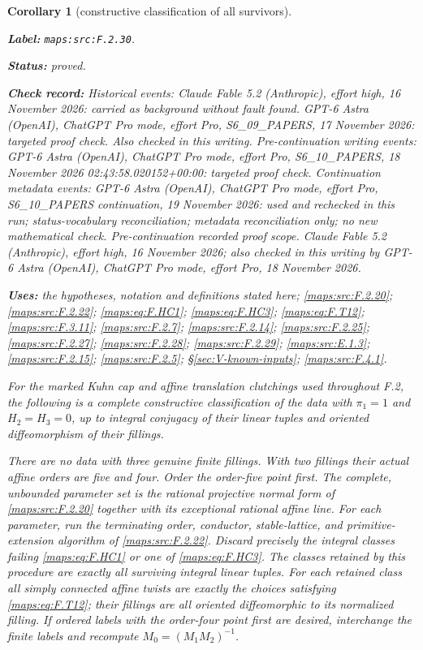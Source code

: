 \documentclass[11pt,a4paper]{article}
\newtheorem{corollary}[corollary]{Corollary}
\theoremstyle{definition}
\newcommand{\StatementRecord}[4]{\par\smallskip\begingroup\upshape\raggedright\noindent\textbf{Label:} \nolinkurl{#1}.\par\noindent\textbf{Status:} #2.\par\noindent\textbf{Check record:} #3.\par\noindent\textbf{Uses:} #4.\par\endgroup\smallskip}
\begin{document}
\begin{corollary}[constructive classification of all survivors]\label{maps:src:F.2.30}
\StatementRecord{maps:src:F.2.30}{proved}{Historical events: Claude Fable 5.2 (Anthropic), effort high, 16 November 2026: carried as background without fault found. GPT-6 Astra (OpenAI), ChatGPT Pro mode, effort Pro, S6\_09\_PAPERS, 17 November 2026: targeted proof check. Also checked in this writing. Pre-continuation writing events: GPT-6 Astra (OpenAI), ChatGPT Pro mode, effort Pro, S6\_10\_PAPERS, 18 November 2026 02:43:58.020152+00:00: targeted proof check. Continuation metadata events: GPT-6 Astra (OpenAI), ChatGPT Pro mode, effort Pro, S6\_10\_PAPERS continuation, 19 November 2026: used and rechecked in this run; status-vocabulary reconciliation; metadata reconciliation only; no new mathematical check. \emph{Pre-continuation recorded proof scope.} Claude Fable 5.2 (Anthropic), effort high, 16 November 2026; also checked in this writing by GPT-6 Astra (OpenAI), ChatGPT Pro mode, effort Pro, 18 November 2026}{the hypotheses, notation and definitions stated here; \cref{maps:src:F.2.20}; \cref{maps:src:F.2.22}; \cref{maps:eq:F.HC1}; \cref{maps:eq:F.HC3}; \cref{maps:eq:F.T12}; \cref{maps:src:F.3.11}; \cref{maps:src:F.2.7}; \cref{maps:src:F.2.14}; \cref{maps:src:F.2.25}; \cref{maps:src:F.2.27}; \cref{maps:src:F.2.28}; \cref{maps:src:F.2.29}; \cref{maps:src:E.1.3}; \cref{maps:src:F.2.15}; \cref{maps:src:F.2.5}; \S\ref{sec:V-known-inputs}; \cref{maps:src:F.4.1}}


For the marked Kuhn cap and affine translation clutchings
used throughout F.2, the following is a complete constructive
classification of the data with
$\pi_1=1$ and $H_2=H_3=0$, up to integral conjugacy of their
linear tuples and oriented diffeomorphism of their fillings.

There are no data with three genuine finite fillings.
With two fillings their actual affine orders are five and
four.  Order the order-five point first.
The complete, unbounded parameter set is the rational
projective normal form of \ref{maps:src:F.2.20} together with its
exceptional rational affine line.
For each parameter, run the terminating order,
conductor, stable-lattice, and primitive-extension algorithm
of \ref{maps:src:F.2.22}.  Discard precisely the integral classes failing
\eqref{maps:eq:F.HC1} or one of \eqref{maps:eq:F.HC3}.
The classes retained by this procedure are exactly all
surviving integral linear tuples.
For each retained class all simply connected affine
twists are exactly the choices satisfying \eqref{maps:eq:F.T12};
their fillings are all oriented diffeomorphic to its
normalized filling.
If ordered labels with the order-four point first are
desired, interchange the finite labels and recompute
$M_0=(M_1M_2)^{-1}$.


\end{corollary}
\end{document}
